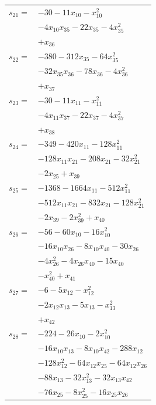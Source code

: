 \begin{longtable}{@{}r@{\;}l@{}}
\(s_{21}=\) & \(\displaystyle -30 -11x_{10} -x_{10}^{2}\) \\
 & \(\displaystyle -4x_{10}x_{35} -22x_{35} -4x_{35}^{2}\) \\
 & \(\displaystyle +x_{36}\) \\[3pt]
\(s_{22}=\) & \(\displaystyle -380 -312x_{35} -64x_{35}^{2}\) \\
 & \(\displaystyle -32x_{35}x_{36} -78x_{36} -4x_{36}^{2}\) \\
 & \(\displaystyle +x_{37}\) \\[3pt]
\(s_{23}=\) & \(\displaystyle -30 -11x_{11} -x_{11}^{2}\) \\
 & \(\displaystyle -4x_{11}x_{37} -22x_{37} -4x_{37}^{2}\) \\
 & \(\displaystyle +x_{38}\) \\[3pt]
\(s_{24}=\) & \(\displaystyle -349 -420x_{11} -128x_{11}^{2}\) \\
 & \(\displaystyle -128x_{11}x_{21} -208x_{21} -32x_{21}^{2}\) \\
 & \(\displaystyle -2x_{25} +x_{39}\) \\[3pt]
\(s_{25}=\) & \(\displaystyle -1368 -1664x_{11} -512x_{11}^{2}\) \\
 & \(\displaystyle -512x_{11}x_{21} -832x_{21} -128x_{21}^{2}\) \\
 & \(\displaystyle -2x_{39} -2x_{39}^{2} +x_{40}\) \\[3pt]
\(s_{26}=\) & \(\displaystyle -56 -60x_{10} -16x_{10}^{2}\) \\
 & \(\displaystyle -16x_{10}x_{26} -8x_{10}x_{40} -30x_{26}\) \\
 & \(\displaystyle -4x_{26}^{2} -4x_{26}x_{40} -15x_{40}\) \\
 & \(\displaystyle -x_{40}^{2} +x_{41}\) \\[3pt]
\(s_{27}=\) & \(\displaystyle -6 -5x_{12} -x_{12}^{2}\) \\
 & \(\displaystyle -2x_{12}x_{13} -5x_{13} -x_{13}^{2}\) \\
 & \(\displaystyle +x_{42}\) \\[3pt]
\(s_{28}=\) & \(\displaystyle -224 -26x_{10} -2x_{10}^{2}\) \\
 & \(\displaystyle -16x_{10}x_{13} -8x_{10}x_{42} -288x_{12}\) \\
 & \(\displaystyle -128x_{12}^{2} -64x_{12}x_{25} -64x_{12}x_{26}\) \\
 & \(\displaystyle -88x_{13} -32x_{13}^{2} -32x_{13}x_{42}\) \\
 & \(\displaystyle -76x_{25} -8x_{25}^{2} -16x_{25}x_{26}\) \\

\end{longtable}
